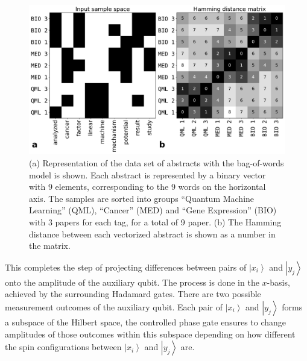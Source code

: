 \documentclass[pra,showkeys,twocolumn,showpacs,aps,10pt]{revtex4-1}
\begin{document}
\begin{figure}[t]
    \centering
  \includegraphics[width=1.85\columnwidth]{vectorized_sample.pdf}
  \caption{
    (a) Representation of the data set of abstracts with the bag-of-words \cite{weikang2016} model is shown.
    Each abstract is represented by a binary vector with 9 elements, corresponding to the 9 words on the horizontal axis.
    The samples are sorted into groups ``Quantum Machine Learning'' (QML), ``Cancer'' (MED) and ``Gene Expression'' (BIO) with 3 papers for each tag, for a total of 9 paper.
    (b) The Hamming distance between each vectorized abstract is shown as a number in the matrix.
  }
  \label{fig:vectorized_sample}
\end{figure}


This completes the step of projecting differences between pairs of $\left| x_i \right\rangle$ and $\left| y_j \right\rangle$ onto the amplitude of the auxiliary qubit.
The process is done in the $x$-basis, achieved by the surrounding Hadamard gates.
There are two possible measurement outcomes of the auxiliary qubit.
Each pair of $\left|x_i \right\rangle$ and $\left| y_j \right\rangle$ forms a subspace of the Hilbert space,
the controlled phase gate ensures to change amplitudes of those outcomes within this subspace depending on how different the spin configurations between $\left| x_i \right\rangle$ and $\left| y_j \right\rangle$ are.
\end{document}
